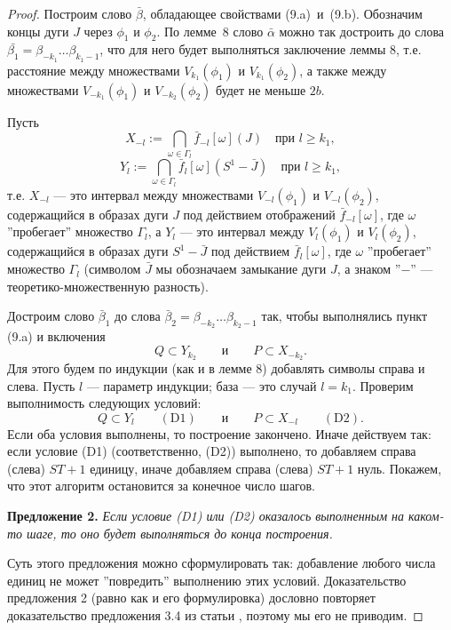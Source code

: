 \documentclass[12pt]{article}
\begin{document}
\begin{proof} 
Построим слово $\bar{\beta}$, обладающее свойствами (9.a)~и~(9.b). Обозначим концы дуги $J$ через $\phi_1$ и $\phi_2$. По лемме~8 слово $\bar{\alpha}$ можно так достроить до слова $\bar{\beta_1}=\beta_{-k_1}\ldots\beta_{k_1-1}$, что для него будет выполняться заключение леммы 8, т.е. расстояние между множествами $V_{k_1}(\phi_1)$ и  $V_{k_1}(\phi_2)$, а также между множествами $V_{-k_1}(\phi_1)$ и $V_{-k_2}(\phi_2)$ будет не меньше $2b$.

Пусть
$$X_{-l}:=\bigcap_{\omega\in\Gamma_l}\bar{f}_{-l}[\omega](J)\quad\textrm{при }l\geq k_1,$$
$$Y_{l}:=\bigcap_{\omega\in\Gamma_l}\bar{f}_{l}[\omega](S^1-\bar{J})\quad\textrm{при }l\geq k_1,$$
т.е. $X_{-l}$ --- это интервал между множествами $V_{-l}(\phi_1)$ и $V_{-l}(\phi_2)$, содержащийся в образах дуги $J$ под действием отображений $\bar{f}_{-l}[\omega]$, где $\omega$ ''пробегает'' множество $\Gamma_l$, а $Y_l$ --- это интервал между
$V_l(\phi_1)$ и $V_l(\phi_2)$, содержащийся в образах дуги $S^1-\bar{J}$ под действием $\bar{f}_l[\omega]$, где $\omega$ ''пробегает'' множество $\Gamma_l$ (символом $\bar{J}$ мы обозначаем замыкание дуги $J$, а знаком ''$-$'' --- теоретико-множественную разность).

Достроим слово $\bar{\beta}_{1}$ до слова $\bar{\beta}_2=\beta_{-k_2}\ldots\beta_{k_2-1}$ так, чтобы выполнялись пункт (9.a) и включения
$$Q\subset Y_{k_2}\qquad\textrm{и}\qquad P\subset X_{-k_2}.$$
Для этого будем по индукции (как и в лемме 8) добавлять символы справа и слева. Пусть $l$ --- параметр индукции; база --- это случай $l=k_1$. 
Проверим выполнимость следующих условий:
$$Q\subset Y_l\qquad (\textrm{D}1)\qquad\textrm{и}\qquad P\subset X_{-l}\qquad (\textrm{D}2).$$
Если оба условия выполнены, то построение закончено. Иначе действуем так: если условие (D1) (соответственно, (D2)) выполнено, то добавляем справа (слева) $ST+1$ единицу, иначе добавляем справа (слева) $ST+1$ нуль.
Покажем, что этот алгоритм остановится за конечное число шагов.

\textbf{Предложение 2.}
\textit{
Если условие (D1) или (D2) оказалось выполненным на каком-то шаге, то оно будет выполняться до конца построения.}

Суть этого предложения можно сформулировать так: добавление любого числа единиц не может ''повредить'' выполнению этих условий. Доказательство предложения 2 (равно как и его формулировка) дословно повторяет доказательство предложения 3.4 из статьи \cite{17}, поэтому мы его не приводим.


\end{proof}
\end{document}
